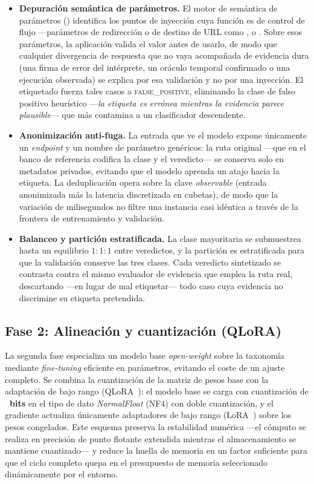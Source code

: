 \begin{itemize}
  \item \textbf{Depuración semántica de parámetros.} El motor de semántica de
  parámetros () identifica los puntos de inyección
  cuya función es de control de flujo ---parámetros de redirección o de destino
  de URL como ,  o . Sobre esos
  parámetros, la aplicación valida el valor antes de usarlo, de modo que
  cualquier divergencia de respuesta que no vaya acompañada de evidencia dura
  (una firma de error del intérprete, un oráculo temporal confirmado o una
  ejecución observada) se explica por esa validación y no por una inyección. El
  etiquetado fuerza tales casos a \textsc{false\_positive}, eliminando la clase
  de falso positivo heurístico ---\emph{la etiqueta es errónea mientras la
  evidencia parece plausible}--- que más contamina a un clasificador
  descendente.
  \item \textbf{Anonimización anti-fuga.} La entrada que ve el modelo expone
  únicamente un \emph{endpoint} y un nombre de parámetro genéricos: la ruta
  original ---que en el banco de referencia codifica la clase y el veredicto---
  se conserva solo en metadatos privados, evitando que el modelo aprenda un
  atajo hacia la etiqueta. La deduplicación opera sobre la clave
  \emph{observable} (entrada anonimizada más la latencia discretizada en
  cubetas), de modo que la variación de milisegundos no filtre una instancia
  casi idéntica a través de la frontera de entrenamiento y validación.
  \item \textbf{Balanceo y partición estratificada.} La clase mayoritaria se
  submuestrea hasta un equilibrio $1{:}1{:}1$ entre veredictos, y la partición
  \IATriajeSplit{} es estratificada para que la validación conserve las tres
  clases. Cada veredicto sintetizado se contrasta contra el mismo evaluador de
  evidencia que emplea la ruta real, descartando ---en lugar de mal etiquetar---
  todo caso cuya evidencia no discrimine su etiqueta pretendida.
\end{itemize}

\subsection{Fase 2: Alineación y cuantización (QLoRA)}
\label{sec:ia-qlora}

La segunda fase especializa un modelo base \emph{open-weight} sobre la taxonomía
mediante \emph{fine-tuning} eficiente en parámetros, evitando el coste de un
ajuste completo. Se combina la cuantización de la matriz de pesos base con la
adaptación de bajo rango (QLoRA~\cite{dettmers2023qlora}): el modelo base se
carga con cuantización de \textbf{\IACuantBits{}~bits} en el tipo de dato
\emph{NormalFloat} (NF4) con doble cuantización, y el gradiente actualiza
únicamente adaptadores de bajo rango (LoRA~\cite{hu2022lora}) sobre los pesos
congelados. Este esquema preserva la estabilidad numérica ---el cómputo se
realiza en precisión de punto flotante extendida mientras el almacenamiento se
mantiene cuantizado--- y reduce la huella de memoria en un factor suficiente
para que el ciclo completo quepa en el presupuesto de memoria seleccionado
dinámicamente por el entorno.

